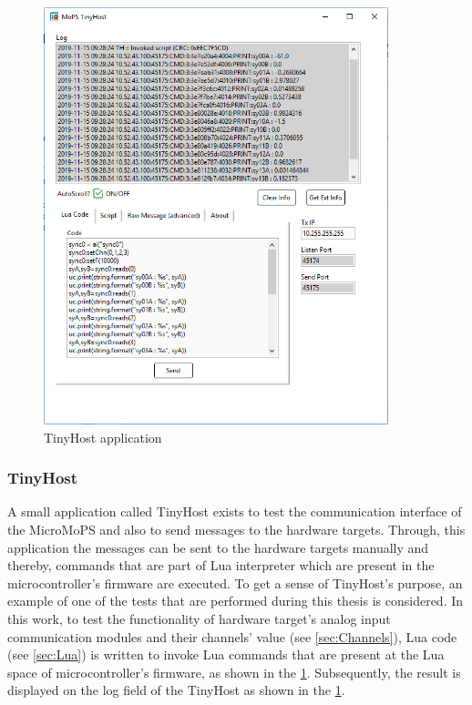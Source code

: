 \begin{figure}[hbt]
		\centering
		\includegraphics[trim=0 0 0 0, clip, width=100mm, scale=0.75]{images/Tinyhostaichannels.PNG}
		\caption{TinyHost application}
		\label{fig:tinyhost}
\end{figure}


\subsubsection{TinyHost}\label{sec:TinyHost}
A small application called TinyHost exists to test the communication interface of the MicroMoPS and also to send messages to the hardware targets. 
Through, this application the messages can be sent to the hardware targets manually and thereby, commands that are part of Lua interpreter which are present in the microcontroller's firmware are executed. 
To get a sense of TinyHost's purpose, an example of one of the tests that are performed during this thesis is considered. 
In this work, to test the functionality of hardware target's analog input communication modules and their channels' value (see \cref{sec:Channels}), Lua code (see \cref{sec:Lua}) is written to invoke Lua commands that are present at the Lua space of microcontroller's firmware, as shown in the \cref{fig:tinyhost}. 
Subsequently, the result is displayed on the log field of the TinyHost as shown in the \cref{fig:tinyhost}. 
